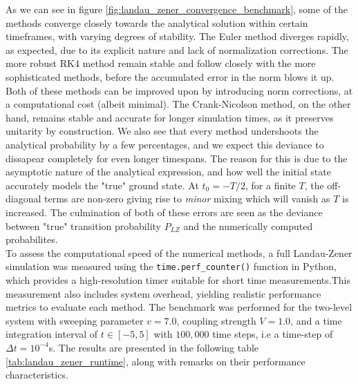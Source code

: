 \documentclass{subfiles}
\begin{document}
As we can see in figure \eqref{fig:landau_zener_convergence_benchmark}, some of the methods converge closely towards the analytical solution within certain timeframes, with varying degrees of stability. The Euler method diverges rapidly, as expected, due to its explicit nature and lack of normalization corrections. The more robust RK4 method remain stable and follow closely with the more sophisticated methods, before the accumulated error in the norm blows it up. Both of these methods can be improved upon by introducing norm corrections, at a computational cost (albeit minimal). The Crank-Nicolson method, on the other hand, remains stable and accurate for longer simulation times, as it preserves unitarity by construction. We also see that every method undershoots the analytical probability by a few percentages, and we expect this deviance to dissapear completely for even longer timespans. The reason for this is due to the asymptotic nature of the analytical expression, and how well the initial state accurately models the "true" ground state. At $t_{0} = -T/2$, for a finite $T$, the off-diagonal terms are non-zero giving rise to \emph{minor} mixing which will vanish as $T$ is increased. The culmination of both of these errors are seen as the deviance between "true" transition probability $P_{LZ}$ and the numerically computed probabilites. 
\\ 

To assess the computational speed of the numerical methods, a full Landau-Zener simulation was measured using the \texttt{time.perf\_counter()} function in Python, which provides a high-resolution timer suitable for short time measurements.This measurement also includes system overhead, yielding realistic performance metrics to evaluate each method. 
The benchmark was performed for the two-level system with sweeping parameter $v=7.0$, coupling strength $V=1.0$, and a time integration interval of $t \in [-5, 5]$ with $100{,}000$ time steps, i.e a time-step of $\Delta t = 10^{-4}$s. The results are presented in the following table \eqref{tab:landau_zener_runtime}, along with remarks on their performance characteristics.
\end{document}
